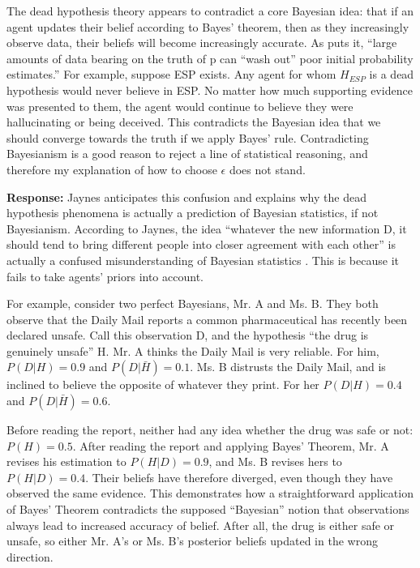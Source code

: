 \documentclass{article}
\begin{document}
The dead hypothesis theory appears to contradict a core Bayesian idea: that if an agent updates their belief according to Bayes' theorem, then as they increasingly observe data, their beliefs will become increasingly accurate. As \citep[pg. 56]{resnik1987choices} puts it, ``large amounts of data bearing on the truth of p can ``wash out'' poor initial probability estimates.'' For example, suppose ESP exists. Any agent for whom \(H_{ESP}\) is a dead hypothesis would never believe in ESP. No matter how much supporting evidence was presented to them, the agent would continue to believe they were hallucinating or being deceived. This contradicts the Bayesian idea that we should converge towards the truth if we apply Bayes' rule. Contradicting Bayesianism is a good reason to reject a line of statistical reasoning, and therefore my explanation of how to choose \(\epsilon\) does not stand.

\textbf{Response:} Jaynes anticipates this confusion and explains why the dead hypothesis phenomena is actually a prediction of Bayesian statistics, if not Bayesianism. According to Jaynes, the idea ``whatever the new information D, it should tend to bring different people into closer agreement with each other'' is actually a confused misunderstanding of Bayesian statistics \citep[pg. 127]{jaynes2003probability}. This is because it fails to take agents' priors into account. 

For example, consider two perfect Bayesians, Mr. A and Ms. B. They both observe that the Daily Mail reports a common pharmaceutical has recently been declared unsafe. Call this observation D, and the hypothesis ``the drug is genuinely unsafe'' H. Mr. A thinks the Daily Mail is very reliable. For him, \(P(D|H) = 0.9\) and \(P(D|\bar{H}) = 0.1\). Ms. B distrusts the Daily Mail, and is inclined to believe the opposite of whatever they print. For her \(P(D|H) = 0.4\) and \(P(D|\bar{H}) = 0.6\).

Before reading the report, neither had any idea whether the drug was safe or not: \(P(H) = 0.5\). After reading the report and applying Bayes' Theorem, Mr. A revises his estimation to \(P(H|D) = 0.9\), and Ms. B revises hers to \(P(H|D) = 0.4\). Their beliefs have therefore diverged, even though they have observed the same evidence. This demonstrates how a straightforward application of Bayes' Theorem contradicts the supposed ``Bayesian'' notion that observations always lead to increased accuracy of belief. After all, the drug is either safe or unsafe, so either Mr. A's or Ms. B's posterior beliefs updated in the wrong direction.
\end{document}
